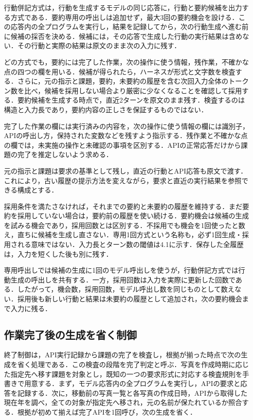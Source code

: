 \documentclass[letter]{ieicej}
\begin{document}
行動併記方式は，行動を生成するモデルの同じ応答に，行動と要約候補を出力する方式である．要約専用の呼出しは追加せず，最大3回の要約機会を設ける．この応答内の全プログラムを実行し，結果を記録してから，次の行動生成へ進む前に候補の採否を決める．候補には，その応答で生成した行動の実行結果は含めない．その行動と実際の結果は原文のまま次の入力に残す．

どの方式でも，要約には完了した作業，次の操作に使う情報，残作業，不確かな点の四つの欄を用いる．候補が得られたら，ハーネスが形式と文字数を検査する．さらに，元の指示と課題，要約，未要約の履歴を含む次回入力全体のトークン数を比べ，候補を採用しない場合より厳密に少なくなることを確認して採用する．要約候補を生成する時点で，直近2ターンを原文のまま残す．検査するのは構造と入力長であり，要約内容の正しさを保証するものではない．

完了した作業の欄には実行済みの内容を，次の操作に使う情報の欄には識別子，APIの呼出し方，保持された変数などを残すよう指示する．残作業と不確かな点の欄では，未実施の操作と未確認の事項を区別する．APIの正常応答だけから課題の完了を推定しないよう求める．

元の指示と課題は要求の基準として残し，直近の行動とAPI応答も原文で渡す．これにより，古い履歴の提示方法を変えながら，要求と直近の実行結果を参照できる構成とする．

採用条件を満たさなければ，それまでの要約と未要約の履歴を維持する．まだ要約を採用していない場合は，要約前の履歴を使い続ける．要約機会は候補の生成を試みる機会であり，採用回数とは区別する．不採用でも機会を1回使ったと数え，直ちに候補を生成し直さない．専用1回方式という名称も，必ず1回生成・採用される意味ではない．入力長とターン数の閾値は4.1に示す．保存した全履歴は，入力を短くした後も別に残す．

専用呼出しでは候補の生成に1回のモデル呼出しを使うが，行動併記方式では行動生成の呼出しを共有する．一方，採用回数は入力を実際に更新した回数である．したがって，機会数，採用回数，モデル呼出し数を同じものとして数えない．採用後も新しい行動と結果は未要約の履歴として追加され，次の要約機会まで入力に残る．

\subsection{作業完了後の生成を省く制御}

終了制御は，API実行記録から課題の完了を検査し，根拠が揃った時点で次の生成を省く処理である．この検査の段階を完了判定と呼ぶ．写真を作成時期に応じた指定先へ移す課題を対象とし，既知の一つの要求形式に対応する検査規則を手書きで用意する．まず，モデル応答内の全プログラムを実行し，APIの要求と応答を記録する．次に，移動前の写真一覧と各写真の作成日時，APIから取得した現在年を調べ，全ての対象が指定先へ移され，元の名前が保たれているか照合する．根拠が初めて揃えば完了APIを1回呼び，次の生成を省く．
\end{document}
